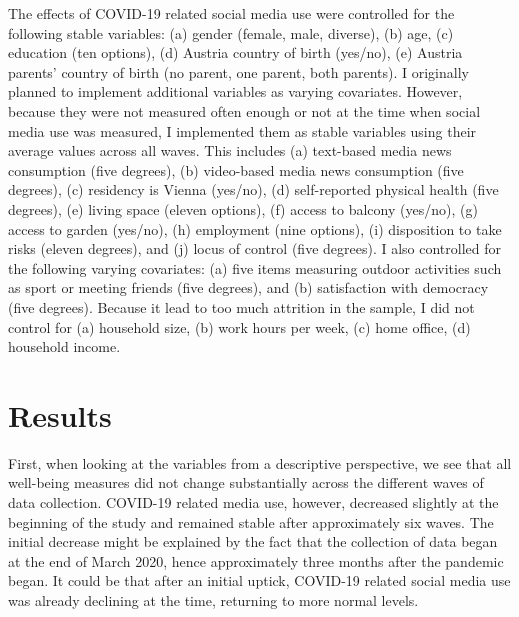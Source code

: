 \documentclass[
  english,
  man,floatsintext]{apa6}
\begin{document}
The effects of COVID-19 related social media use were controlled for the following stable variables:
(a) gender (female, male, diverse), (b) age, (c) education (ten options), (d) Austria country of birth (yes/no), (e) Austria parents' country of birth (no parent, one parent, both parents).
I originally planned to implement additional variables as varying covariates.
However, because they were not measured often enough or not at the time when social media use was measured, I implemented them as stable variables using their average values across all waves.
This includes (a) text-based media news consumption (five degrees), (b) video-based media news consumption (five degrees), (c) residency is Vienna (yes/no), (d) self-reported physical health (five degrees), (e) living space (eleven options), (f) access to balcony (yes/no), (g) access to garden (yes/no), (h) employment (nine options), (i) disposition to take risks (eleven degrees), and (j) locus of control (five degrees).
I also controlled for the following varying covariates: (a) five items measuring outdoor activities such as sport or meeting friends (five degrees), and (b) satisfaction with democracy (five degrees).
Because it lead to too much attrition in the sample, I did not control for (a) household size, (b) work hours per week, (c) home office, (d) household income.

\hypertarget{results}{%
\section{Results}\label{results}}

First, when looking at the variables from a descriptive perspective, we see that all well-being measures did not change substantially across the different waves of data collection.
COVID-19 related media use, however, decreased slightly at the beginning of the study and remained stable after approximately six waves.
The initial decrease might be explained by the fact that the collection of data began at the end of March 2020, hence approximately three months after the pandemic began.
It could be that after an initial uptick, COVID-19 related social media use was already declining at the time, returning to more normal levels.
\end{document}
